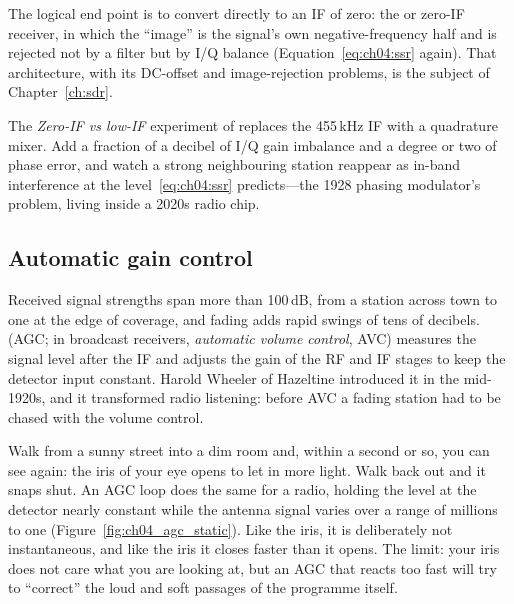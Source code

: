 The logical end point is to convert directly to an IF of zero: the  or zero-IF
receiver, in which the ``image'' is the signal's own negative-frequency half and is rejected not by a filter
but by I/Q balance (Equation~\ref{eq:ch04:ssr} again). That architecture, with its DC-offset and
image-rejection problems, is the subject of Chapter~\ref{ch:sdr}.

\begin{tryit}
The \emph{Zero-IF vs low-IF} experiment of  replaces the 455\,kHz IF with a
quadrature mixer. Add a fraction of a decibel of I/Q gain imbalance and a degree or two of phase error, and
watch a strong neighbouring station reappear as in-band interference at the level~\eqref{eq:ch04:ssr}
predicts---the 1928 phasing modulator's problem, living inside a 2020s radio chip.
\end{tryit}

\subsection{Automatic gain control}
\label{sec:ch04:agc}

Received signal strengths span more than 100\,dB, from a station across town to one at the edge of coverage,
and fading adds rapid swings of tens of decibels.  (AGC; in broadcast receivers,
\emph{automatic volume control}, AVC) measures the signal level after the IF and adjusts the gain of the RF
and IF stages to keep the detector input constant. Harold Wheeler of Hazeltine introduced it in the
mid-1920s, and it transformed radio listening: before AVC a fading station had to be chased with the volume
control.

\begin{analogy}
Walk from a sunny street into a dim room and, within a second or so, you can see again: the iris of your eye
opens to let in more light. Walk back out and it snaps shut. An AGC loop does the same for a radio, holding
the level at the detector nearly constant while the antenna signal varies over a range of millions to one
(Figure~\ref{fig:ch04_agc_static}). Like the iris, it is deliberately not instantaneous, and like the iris it
closes faster than it opens. The limit: your iris does not care what you are looking at, but an AGC that
reacts too fast will try to ``correct'' the loud and soft passages of the programme itself.
\end{analogy}

